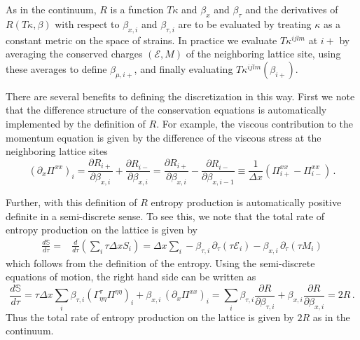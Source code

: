 \documentclass[12pt,aps,preprint,nofootinbib,noshowkeys,noshowpacs,longbibliography,superscriptaddress,tightenlines]{revtex4-2}
\def\edense{{\mathcal{E}}}
\def\pdense{M}
\def\st{\begin{equation}}
\def\stp{\end{equation}}
\begin{document}
As in the continuum, $R$ is a function $T\kappa$ and $\beta_{x}$ and
$\beta_{\tau}$ and the  derivatives of $R(T\kappa, \beta)$ with respect to $\beta_{x, i}$ and
$\beta_{\tau, i}$ are to be evaluated by treating $\kappa$ as a constant
metric on the space of strains.  In practice we evaluate $T\kappa^{ijlm}$ at $i+$ by 
averaging the conserved charges $(\edense, \pdense)$ of the neighboring lattice site,  using these
averages to define $\beta_{\mu, i+}$,  and finally evaluating
$T\kappa^{ijlm}(\beta_{i+})$.

There are several benefits to defining the discretization in this way.  First we
note that  the difference structure of the conservation equations is
automatically implemented by the definition of $R$. For example,  the viscous
contribution to the momentum equation is given by the difference of the viscous
stress at the neighboring lattice sites
\st
(\partial_x\Pi^{xx})_i = \frac{\partial R_{i+} }{\partial \beta_{x, i}} + \frac{\partial R_{i-} }{\partial \beta_{x, i}}  
 = 
  \frac{\partial R_{i+} }{\partial \beta_{x, i}} - \frac{\partial R_{i-} }{\partial \beta_{x, i-1}} \equiv  
 \frac{1}{\Delta x} \left(\Pi^{xx}_{i+} - \Pi^{xx}_{i-} \right) \, . 
\stp

Further,  with this definition of $R$ entropy production is automatically positive definite  in a semi-discrete sense.  To see this,  we note that the total rate of entropy production on the lattice is given by
\begin{align}
  \frac{d\mathbb{S}}{d\tau} =&  \frac{d}{d\tau} \left( \sum_i \tau \Delta x S_i \right) =
\Delta x \sum_i -\beta_{\tau, i} \,  \partial_\tau (\tau\edense_i)   - \beta_{x, i} \,   \partial_\tau (\tau \pdense_i) 
\end{align}
which follows from the definition of the entropy.
Using the semi-discrete equations of motion,  the right hand side can be written as
\st
\frac{d\mathbb{S}}{d\tau} = 
\tau \Delta x \sum_i \beta_{\tau, i}  (\Gamma^{\tau}_{\eta\eta} \Pi^{\eta\eta})_i + \beta_{x, i} \,
(\partial_x  \Pi^{xx})_i =   \sum_i \beta_{\tau, i} \frac{\partial R}{\partial \beta_{\tau, i}}
+ \beta_{x, i} \frac{\partial R}{\partial\beta_{x, i}} = 2 R  \, .
\stp
Thus the total rate of entropy production on the lattice is given by $2R$ as
in the continuum.
\end{document}

